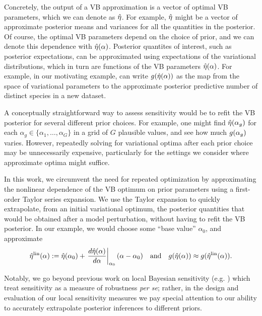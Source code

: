 Concretely, the output of a VB approximation is a vector of optimal VB
parameters, which we can denote as $\hat\eta$.  For example, $\hat\eta$ might be a
vector of approximate posterior means and variances for all the quantities in
the posterior.  Of course, the optimal VB parameters depend on the choice of
prior, and we can denote this dependence with $\hat\eta(\alpha)$.  Posterior
quantites of interest, such as posterior expectations, can be approximated using
expectations of the variational distributions, which in turn are functions of
the VB parameters $\hat\eta(\alpha)$. For example, in our motivating example, can
write $g(\hat\eta(\alpha))$ as the map from the space of variational parameters
to the approximate posterior predictive number of distinct species in a new
dataset.

A conceptually straightforward way to assess sensitivity would be to refit the
VB posterior for several different prior choices.  For example, one might find
$\hat\eta(\alpha_g)$ for each $\alpha_g \in \{\alpha_1, \ldots, \alpha_G \}$ in a
grid of $G$ plausible values, and see how much $g(\alpha_g)$ varies. However,
repeatedly solving for variational optima after each prior choice may be
unnecessarily expensive, particularly for the settings we consider where
approximate optima might suffice.

In this work, we circumvent the need for repeated optimization by approximating
the nonlinear dependence of the VB optimum on prior parameters using a
first-order Taylor series expansion. We use the Taylor expansion to quickly
extrapolate, from an initial variational optimum, the posterior quantities that
would be obtained after a model perturbation, without having to refit the VB
posterior.  In our example, we would choose some ``base value'' $\alpha_0$,
and approximate
%
\begin{align*}
%
\etalin(\alpha) :=
    \etaopt(\alpha_0) +
    \fracat{d\etaopt(\alpha)}{d\alpha}{\alpha_0} (\alpha - \alpha_0)
\mathand
g(\etaopt(\alpha)) \approx g(\etalin(\alpha)).
%
\end{align*}
%



Notably, we go beyond previous work on local Bayesian sensitivity
(e.g. \citet{gustafson:1996:local, basu:1996:local}) which treat sensitivity as
a measure of robustness \textit{per se}; rather, in the design and evaluation of
our local sensitivity measures we pay special attention to our ability to
accurately extrapolate posterior inferences to different priors.

